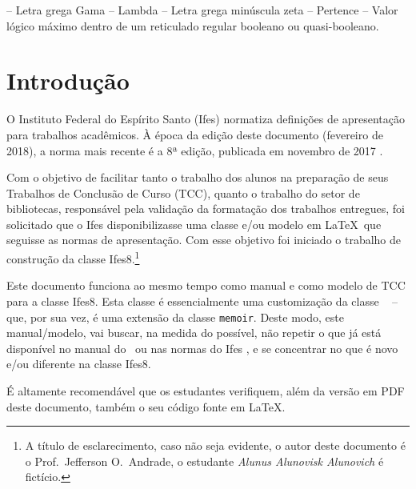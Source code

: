 \documentclass[times,english,brazil,oneside,section=TITLE]{ifes8}
\newcommand{\ifestex}{\textsf{Ifes$8$}}
\begin{document}
\begin{simbolos}
  \simb{$\Gamma$} -- Letra grega Gama
  \simb{$\Lambda$} -- Lambda
  \simb{$\zeta$} -- Letra grega minúscula zeta
  \simb{$\in$} -- Pertence
  \simb{$\top$} -- Valor lógico máximo dentro de um reticulado regular booleano ou quasi-booleano.
\end{simbolos}
\cleardoublepage


\tableofcontents*
\cleardoublepage


\textual


\setlength{\afterchapskip}{0\baselineskip}


\chapter{Introdução}
\label{cha:introducao}

O Instituto Federal do Espírito Santo (Ifes) normatiza definições de
apresentação para trabalhos acadêmicos. À época da edição deste
documento (fevereiro de 2018), a norma mais recente é a 8ª edição,
publicada em novembro de 2017 \cite{Ifes2017}.

Com o objetivo de facilitar tanto o trabalho dos alunos na preparação
de seus Trabalhos de Conclusão de Curso (TCC), quanto o trabalho do
setor de bibliotecas, responsável pela validação da formatação dos
trabalhos entregues, foi solicitado que o Ifes disponibilizasse uma
classe e/ou modelo em \LaTeX\ que seguisse as normas de
apresentação. Com esse objetivo foi iniciado o trabalho de construção
da classe \ifestex.\footnote{A título de esclarecimento, caso não seja
  evidente, o autor deste documento é o Prof.\ Jefferson O.\ Andrade,
  o estudante \emph{Alunus Alunovisk Alunovich} é fictício.}

Este documento funciona ao mesmo tempo como manual e como modelo de
TCC para a classe \ifestex. Esta classe é essencialmente uma
customização da classe \abnTeX\ \cite{abntex2classe} -- que, por sua
vez, é uma extensão da classe \texttt{memoir}. Deste modo, este
manual/modelo, vai buscar, na medida do possível, não repetir o que já
está disponível no manual do \abnTeX\ ou nas normas do Ifes
\cite{Ifes2017}, e se concentrar no que é novo e/ou diferente na
classe \ifestex.

É altamente recomendável que os estudantes verifiquem, além da versão
em PDF deste documento, também o seu código fonte em \LaTeX.
\end{document}
